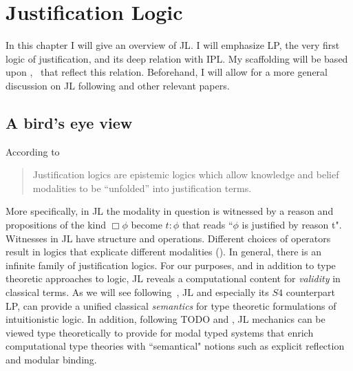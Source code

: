 \chapter{Justification Logic}\label{jllogic}
In this chapter I will give an overview of \ac {JL}. I will emphasize LP, 
the very first logic of justification, and its deep relation with 
\ac{IPL}. My scaffolding will be based upon \cite{Art01BSL},~\cite{Art95TR}  
that reflect this relation. Beforehand, I will allow for a more general discussion on 
\ac{JL} following \cite{sep-logic-justification} and other 
relevant papers.


\section{A bird's eye view}
According to \cite{sep-logic-justification}\begin{quotation} Justification logics are epistemic logics which allow knowledge and belief modalities to be ``unfolded'' into justification terms.
\end{quotation}
 More specifically, in \ac{JL} the modality in question is witnessed by a reason and propositions of the kind $\Box\phi$ become $t:\phi$ that reads ``$\phi$ is justified by reason t". Witnesses in \ac{JL} have structure and operations. Different choices of operators result in logics that explicate different modalities ({}). 
 In general, there is an infinite family of justification logics.
 For our purposes, and in addition to type theoretic approaches to logic, \ac{JL} reveals a computational content for \emph{validity} in classical terms. As we will see following~\cite{artemov97un}, \ac{JL} and especially its {\sf $S4$} counterpart \ac{LP}, can provide a unified classical \emph{semantics} for type theoretic formulations of intuitionistic logic. In addition, following TODO and \cite{DBLP:journals/entcs/PouliasisP14}, \ac{JL} mechanics can be viewed type theoretically to provide for modal typed systems that enrich computational type theories with ``semantical" notions such as explicit reflection and modular binding. 
 

